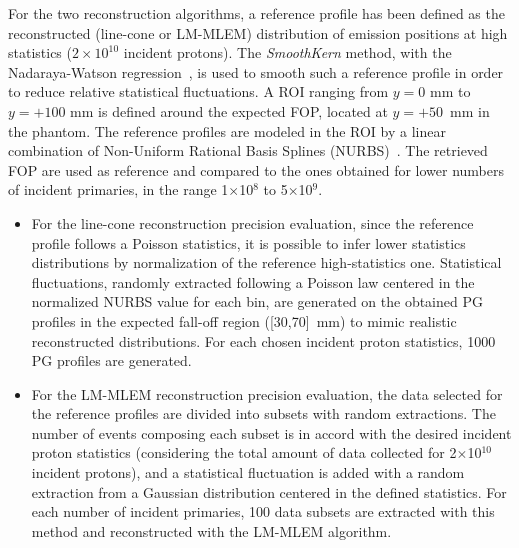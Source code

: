 For the two reconstruction algorithms, a reference profile has been defined as the reconstructed (line-cone or LM-MLEM) distribution of emission positions at high statistics ($\mathrm{2\times10^{10}}$ incident protons). The \textit{SmoothKern} method, with the Nadaraya-Watson regression~\cite{Nadaraya_regression, Watson_regression}, is used to smooth such a reference profile in order to reduce relative statistical fluctuations. A ROI ranging from $y=0$ mm to $y=+100$ mm is defined around the expected FOP, located at $y=+50$~mm in the phantom. The reference profiles are modeled in the ROI by a linear combination of Non-Uniform Rational Basis Splines (NURBS)~\cite{NURBS}. The retrieved FOP are used as reference and compared to the ones obtained for lower numbers of incident primaries, in the range 1$\times$10$^8$ to 5$\times$10$^9$. 
\begin{itemize}
\item For the line-cone reconstruction precision evaluation, since the reference profile follows a Poisson statistics, it is possible to infer lower statistics distributions by normalization of the reference high-statistics one. Statistical fluctuations, randomly extracted following a Poisson law centered in the normalized NURBS value for each bin, are generated on the obtained PG profiles in the expected fall-off region ([30,70]~mm) to mimic realistic reconstructed distributions. For each chosen incident proton statistics, 1000 PG profiles are generated.
\item For the LM-MLEM reconstruction precision evaluation, the data selected for the reference profiles are divided into subsets with random extractions. The number of events composing each subset is in accord with the desired incident proton statistics (considering the total amount of data collected for 2$\times$10$^{10}$ incident protons), and a statistical fluctuation is added with a random extraction from a Gaussian distribution centered in the defined statistics. For each number of incident primaries, 100 data subsets are extracted with this method and reconstructed with the LM-MLEM algorithm.
\end{itemize}
